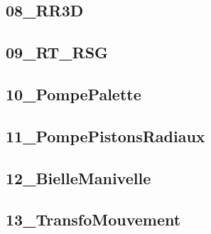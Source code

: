 \subsection{08\_RR3D}
\graphicspath{{../02-Modélisation des mécanismes/TD/Géométrie/08_RR3D/images/}{../02-Modélisation des mécanismes/TD/Géométrie/08_RR3D/}{../Style/png/}}


\subsection{09\_RT\_RSG}
\graphicspath{{../02-Modélisation des mécanismes/TD/Géométrie/09_RT_RSG/images/}{../02-Modélisation des mécanismes/TD/Géométrie/09_RT_RSG/}{../Style/png/}}


\subsection{10\_PompePalette}
\graphicspath{{../02-Modélisation des mécanismes/TD/Géométrie/10_PompePalette/images/}{../02-Modélisation des mécanismes/TD/Géométrie/10_PompePalette/}{../Style/png/}}


\subsection{11\_PompePistonsRadiaux}
\graphicspath{{../02-Modélisation des mécanismes/TD/Géométrie/11_PompePistonsRadiaux/images/}{../02-Modélisation des mécanismes/TD/Géométrie/11_PompePistonsRadiaux/}{../Style/png/}}


\subsection{12\_BielleManivelle}
\graphicspath{{../02-Modélisation des mécanismes/TD/Géométrie/12_BielleManivelle/images/}{../02-Modélisation des mécanismes/TD/Géométrie/12_BielleManivelle/}{../Style/png/}}


\subsection{13\_TransfoMouvement}
\graphicspath{{../02-Modélisation des mécanismes/TD/Géométrie/13_TransfoMouvement/images/}{../02-Modélisation des mécanismes/TD/Géométrie/13_TransfoMouvement/}{../Style/png/}}


